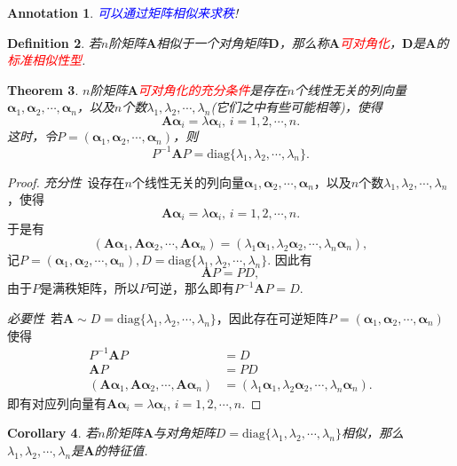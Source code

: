 \documentclass{article}
\newtheorem{theorem}{Theorem}[section]
\newtheorem{corollary}[theorem]{Corollary}
\newtheorem{definition}[theorem]{Definition}
\newtheorem{annotation}[theorem]{Annotation}
\newcommand{\mbf}[1]{\bm{#1}}
\newcommand{\redt}[1]{\textcolor{red}{#1}}
\newcommand{\bluet}[1]{\textcolor{blue}{#1}}
\begin{document}
\begin{annotation}
\rm \bluet{可以通过矩阵相似来求秩}!
\end{annotation}

\begin{definition}
\rm 若$n$阶矩阵$\mbf{A}$相似于一个对角矩阵$\mbf{D}$，那么称$\mbf{A}$\redt{可对角化}，$\mbf{D}$是$\mbf{A}$的\redt{标准相似性型}. 
\end{definition}

\begin{theorem}
\rm $n$阶矩阵$\mbf{A}$\redt{可对角化的充分条件}是存在$n$个线性无关的列向量$\mbf{\alpha}_1,\mbf{\alpha}_2,\cdots,\mbf{\alpha}_n$，以及$n$个数$\lambda_1,\lambda_2,\cdots,\lambda_n$(它们之中有些可能相等)，使得
$$
\mbf{A}\mbf{\alpha}_i = \lambda\mbf{\alpha}_i,\, i = 1,2,\cdots,n.
$$
这时，令$P = (\mbf{\alpha}_1,\mbf{\alpha}_2,\cdots,\mbf{\alpha}_n)$，则
$$
P^{-1}\mbf{A}P = \text{diag}\{\lambda_1,\lambda_2,\cdots,\lambda_n\}.
$$
\end{theorem}

\begin{proof}
\rm \emph{充分性}\ 设存在$n$个线性无关的列向量$\mbf{\alpha}_1,\mbf{\alpha}_2,\cdots,\mbf{\alpha}_n$，以及$n$个数$\lambda_1,\lambda_2,\cdots,\lambda_n$，使得
$$
\mbf{A}\mbf{\alpha}_i = \lambda\mbf{\alpha}_i,\, i = 1,2,\cdots,n.
$$
于是有
$$
(\mbf{A}\mbf{\alpha}_1,\mbf{A}\mbf{\alpha}_2,\cdots,\mbf{A}\mbf{\alpha}_n) = (\lambda_1\mbf{\alpha}_1,\lambda_2\mbf{\alpha}_2,\cdots,\lambda_n\mbf{\alpha}_n),
$$
记$P=(\mbf{\alpha}_1,\mbf{\alpha}_2,\cdots,\mbf{\alpha}_n), D = \text{diag}\{\lambda_1,\lambda_2,\cdots,\lambda_n\}$. 因此有
$$
\mbf{A}P = PD,
$$
由于$P$是满秩矩阵，所以$P$可逆，那么即有$P^{-1}\mbf{A}P = D$.

\emph{必要性}\ 若$\mbf{A} \sim D=\text{diag}\{\lambda_1,\lambda_2,\cdots,\lambda_n\}$，因此存在可逆矩阵$P=(\mbf{\alpha}_1,\mbf{\alpha}_2,\cdots,\mbf{\alpha}_n)$使得
$$
\begin{array}{rl}
P^{-1}\mbf{A}P &= D\\
\mbf{A}P &= PD\\
(\mbf{A}\mbf{\alpha}_1,\mbf{A}\mbf{\alpha}_2,\cdots,\mbf{A}\mbf{\alpha}_n) &= (\lambda_1\mbf{\alpha}_1,\lambda_2\mbf{\alpha}_2,\cdots,\lambda_n\mbf{\alpha}_n).
\end{array}
$$
即有对应列向量有$\mbf{A}\mbf{\alpha}_i = \lambda\mbf{\alpha}_i,\, i = 1,2,\cdots,n.$
\end{proof}

\begin{corollary}
\rm 若$n$阶矩阵$\mbf{A}$与对角矩阵$D=\text{diag}\{\lambda_1,\lambda_2,\cdots,\lambda_n\}$相似，那么$\lambda_1,\lambda_2,\cdots,\lambda_n$是$\mbf{A}$的特征值.
\end{corollary}
\end{document}
